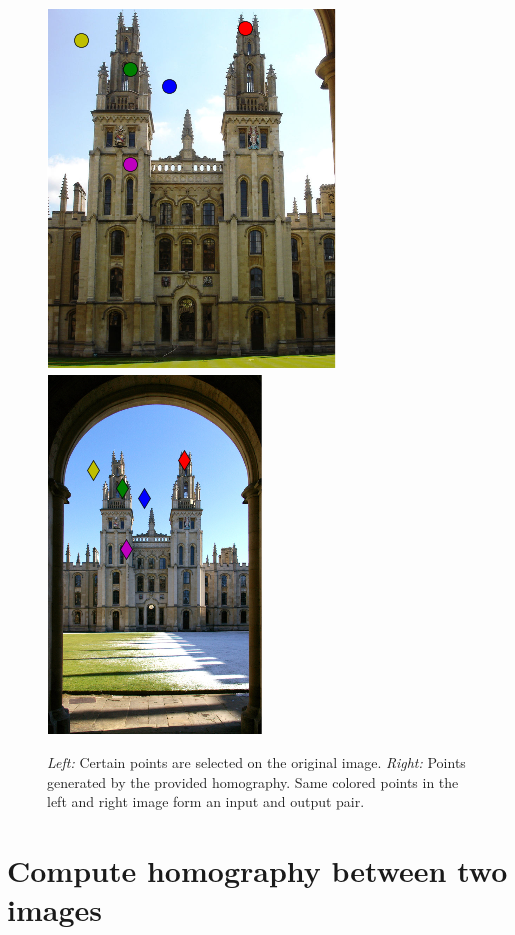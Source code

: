 \documentclass[a4paper,10pt,twoside]{article}
\begin{document}
\begin{figure}
  \begin{center}
    \includegraphics[width=.48\textwidth]{points1}
    \includegraphics[width=.48\textwidth]{points2}
  \end{center}
  \caption{\emph{Left:} Certain points are selected on the original image. \emph{Right:} Points generated by the provided homography. Same colored points in the left and right image form an input and output pair.}
  \label{fig:points}
\end{figure}

\section{Compute homography between two images}
\end{document}
